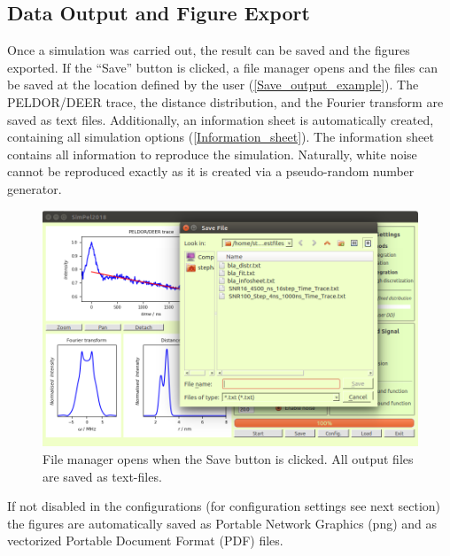 \documentclass[pdftex,bezier,german,a4,twoside, headexclude,12pt,nochapterprefix, titlepage]{extarticle}
\begin{document}
\subsection{Data Output and Figure Export}
Once a simulation was carried out, the result can be saved and the figures exported. If the ``Save'' button is clicked, a
file manager opens and the files can be saved at the  location defined by the user (\autoref{Save_output_example}).
The PELDOR/DEER trace, the distance distribution, and the Fourier transform are saved as text files. Additionally,
an information sheet is automatically created, containing all simulation options (\autoref{Information_sheet}).
The information sheet contains all information to reproduce the simulation. Naturally, white noise cannot
be reproduced exactly as it is created via a pseudo-random number generator.
\begin{figure}[!htb]
\centering
\includegraphics[scale=0.5]{Save_output_example.png}
    \caption{File manager opens when the Save button is clicked. All output files are saved as text-files.
    }
\label{Save_output_example}
\end{figure} 
If not disabled in the configurations (for configuration settings see next section) the figures are automatically
saved as Portable Network Graphics (png) and  as vectorized Portable Document Format (PDF) files.
\end{document}

